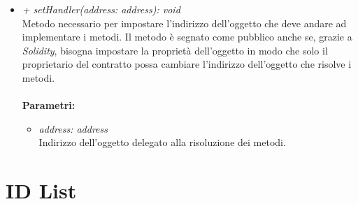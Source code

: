 \begin{itemize}
\begin{itemize}
\begin{itemize}
		\end{itemize}
		\item \textit{+ setHandler(address: address): void}\\
		Metodo necessario per impostare l'indirizzo dell'oggetto che deve andare ad implementare i metodi. Il metodo è segnato come pubblico anche se, grazie a \textit{Solidity}, bisogna impostare la proprietà dell'oggetto in modo che solo il proprietario del contratto possa cambiare l'indirizzo dell'oggetto che risolve i metodi.\\\\
		\textbf{Parametri:}
		\begin{itemize}
			\item \textit{address: address}\\
			Indirizzo dell'oggetto delegato alla risoluzione dei metodi.
		\end{itemize}
	\end{itemize}
\end{itemize}
\section{ID List}
